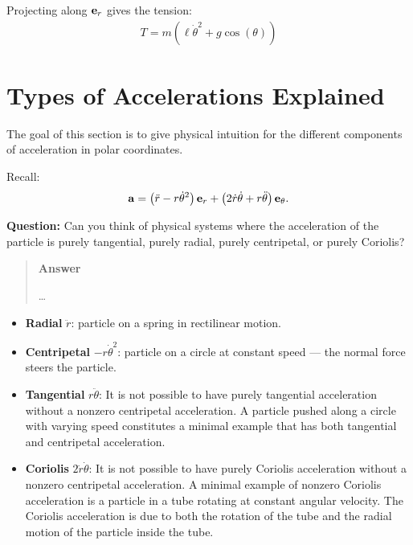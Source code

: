 \documentclass[
  letterpaper,
  DIV=11,
  numbers=noendperiod]{scrreprt}
\providecommand{\tightlist}{%
  \setlength{\itemsep}{0pt}\setlength{\parskip}{0pt}}
\newcommand{\lp}{\left(}
\newcommand{\rp}{\right)}
\begin{document}
Projecting along \({\bf e}_r\) gives the tension: \begin{align*}
    T = m\lp\ell\dot{\theta}^2+g\cos(\theta)\rp
\end{align*}

\section{Types of Accelerations
Explained}\label{types-of-accelerations-explained}

The goal of this section is to give physical intuition for the different
components of acceleration in polar coordinates.

Recall: \begin{align*}
    {\bf a} = \lp\ddot{r}-r\dot{\theta}^2\rp{\bf e}_r+\lp2\dot{r}\dot{\theta}+r\ddot{\theta}\rp{\bf e}_\theta.
\end{align*}

\begin{tcolorbox}[enhanced jigsaw, arc=.35mm, bottomrule=.15mm, bottomtitle=1mm, breakable, colback=white, colbacktitle=quarto-callout-tip-color!10!white, colframe=quarto-callout-tip-color-frame, coltitle=black, left=2mm, leftrule=.75mm, opacityback=0, opacitybacktitle=0.6, rightrule=.15mm, title=\textcolor{quarto-callout-tip-color}{\faLightbulb}\hspace{0.5em}{Think!}, titlerule=0mm, toprule=.15mm, toptitle=1mm]

\textbf{Question:} Can you think of physical systems where the
acceleration of the particle is purely tangential, purely radial, purely
centripetal, or purely Coriolis?

\begin{quote}
\textbf{Answer}

\ldots{}
\end{quote}

\end{tcolorbox}

\begin{itemize}
\tightlist
\item
  \textbf{Radial} \(\ddot{r}\): particle on a spring in rectilinear
  motion.
\item
  \textbf{Centripetal} \(-r\dot{\theta}^2\): particle on a circle at
  constant speed --- the normal force steers the particle.
\item
  \textbf{Tangential} \(r\ddot{\theta}\): It is not possible to have
  purely tangential acceleration without a nonzero centripetal
  acceleration. A particle pushed along a circle with varying speed
  constitutes a minimal example that has both tangential and centripetal
  acceleration.
\item
  \textbf{Coriolis} \(2\dot{r}\dot{\theta}\): It is not possible to have
  purely Coriolis acceleration without a nonzero centripetal
  acceleration. A minimal example of nonzero Coriolis acceleration is a
  particle in a tube rotating at constant angular velocity. The Coriolis
  acceleration is due to both the rotation of the tube and the radial
  motion of the particle inside the tube.
\end{itemize}
\end{document}
